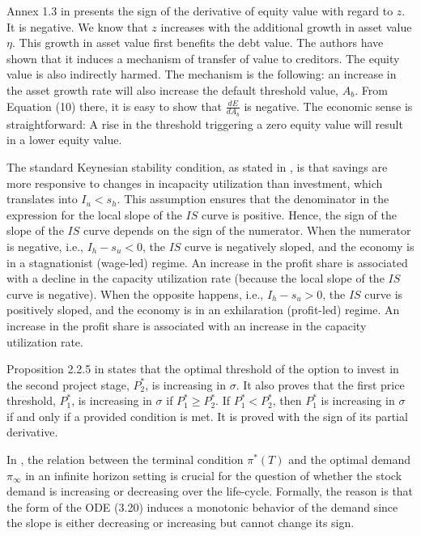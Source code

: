 \documentclass[11pt]{book}
\begin{document}
Annex 1.3 in \cite{de2017debt} presents the sign of the derivative
of equity value with regard to $z$. It is negative. We know that
$z$ increases with the additional growth in asset value $\eta$.
This growth in asset value first benefits the debt value. The authors
have shown that it induces a mechanism of transfer of value to creditors.
The equity value is also indirectly harmed. The mechanism is the following:
an increase in the asset growth rate will also increase the default
threshold value, $A_{b}$. From Equation (10) there, it is easy to
show that $\frac{dE}{dA_{b}}$ is negative. The economic sense is
straightforward: A rise in the threshold triggering a zero equity
value will result in a lower equity value.

The standard Keynesian stability condition, as stated in \cite{basu2018does},
is that savings are more responsive to changes in incapacity utilization
than investment, which translates into $I_{u}<s_{h}$. This assumption
ensures that the denominator in the expression for the local slope
of the $IS$ curve is positive. Hence, the sign of the slope of the
$IS$ curve depends on the sign of the numerator. When the numerator
is negative, i.e., $I_{h}-s_{u}<0$, the $IS$ curve is negatively
sloped, and the economy is in a stagnationist (wage-led) regime. An
increase in the profit share is associated with a decline in the capacity
utilization rate (because the local slope of the $IS$ curve is negative).
When the opposite happens, i.e., $I_{h}-s_{u}>0$, the $IS$ curve
is positively sloped, and the economy is in an exhilaration (profit-led)
regime. An increase in the profit share is associated with an increase
in the capacity utilization rate.

Proposition 2.2.5 in \cite{olsen2018optimal} states that the optimal
threshold of the option to invest in the second project stage, $P_{2}^{\ast}$,
is increasing in $\sigma$. It also proves that the first price threshold,
$P_{1}^{\ast}$, is increasing in $\sigma$ if $P_{1}^{\ast}\geq P_{2}^{\ast}$.
If $P_{1}^{\ast}<P_{2}^{\ast}$, then $P_{1}^{\ast}$ is increasing
in $\sigma$ if and only if a provided condition is met. It is proved
with the sign of its partial derivative.

In \cite{kraft2019consumption}, the relation between the terminal
condition $\pi^{\ast}\left(T\right)$ and the optimal demand $\pi_{\infty}$
in an infinite horizon setting is crucial for the question of whether
the stock demand is increasing or decreasing over the life-cycle.
Formally, the reason is that the form of the ODE (3.20) induces a
monotonic behavior of the demand since the slope is either decreasing
or increasing but cannot change its sign.
\end{document}
